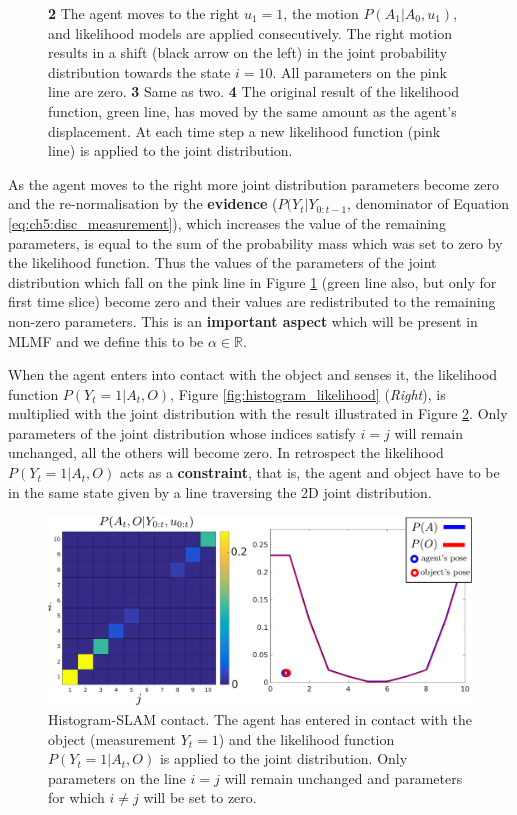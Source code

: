 \begin{figure}
{  \textbf{2} The agent moves to the right $u_1=1$, the motion $P(A_1|A_0,u_1)$, and likelihood models are applied consecutively. The right motion results in a shift (black arrow on the left) in the joint probability 
  distribution towards the state $i=10$. All parameters on the pink line are zero. \textbf{3} Same as two. \textbf{4} The original result of the likelihood function,
  green line, has moved by the same amount as the agent's displacement. At each time step a new likelihood function (pink line) is applied to the joint distribution.}
  \label{fig:discrete_example}
\end{figure}

As the agent moves to the right more joint distribution parameters become zero and the re-normalisation by the \textbf{evidence} ($P(Y_t|Y_{0:t-1}$, denominator of Equation \ref{eq:ch5:disc_measurement}), 
which increases the value of the remaining parameters, is equal to the sum of the probability mass which was set to zero by the likelihood function.
Thus the values of the parameters of the joint distribution which fall on the pink line in Figure \ref{fig:discrete_example} 
(green line also, but only for first time slice) become zero and their values are redistributed to the remaining non-zero parameters. 
This is an \textbf{important aspect} which will be present in MLMF and we define this to be $\alpha \in \mathbb{R}$.

When the agent enters into contact with the object and senses it, the likelihood function $P(Y_t=1|A_t,O)$, Figure \ref{fig:histogram_likelihood} (\textit{Right}), is 
multiplied with the joint distribution with the result illustrated in Figure \ref{fig:discrete_example_contact}. Only parameters of the joint distribution whose indices
satisfy $i = j$ will remain unchanged, all the others will become zero. In retrospect the likelihood $P(Y_t=1|A_t,O)$ acts as a \textbf{constraint}, 
that is, the agent and object have to be in the same state given by a line traversing the 2D joint distribution.

\begin{figure}
 \centering
 \includegraphics[width=\textwidth]{./ch5-MLMF/Figures/explenation/joint_marginal_contact.pdf}
 \caption{Histogram-SLAM contact. The agent has entered in contact with the object (measurement $Y_t = 1$) and the likelihood function $P(Y_t=1|A_t,O)$ is applied to the joint
 distribution. Only parameters on the line $i=j$ will remain unchanged and parameters for which $i \not= j$ will be set to zero.}
 \label{fig:discrete_example_contact}
\end{figure}

